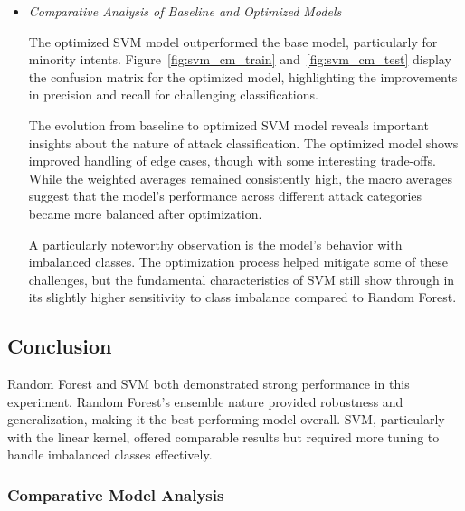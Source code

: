 \begin{itemize}
                \item \textit{Comparative Analysis of Baseline and Optimized Models}
                
                    \vspace{0.3em}
                    

                    The optimized SVM model outperformed the base model, particularly for minority intents. Figure~\ref{fig:svm_cm_train} and~\ref{fig:svm_cm_test} display the confusion matrix for the optimized model, highlighting the improvements in precision and recall for challenging classifications.
                    
                    The evolution from baseline to optimized SVM model reveals important insights about the nature of attack classification. The optimized model shows improved handling of edge cases, though with some interesting trade-offs. While the weighted averages remained consistently high, the macro averages suggest that the model's performance across different attack categories became more balanced after optimization.
            
                    A particularly noteworthy observation is the model's behavior with imbalanced classes. The optimization process helped mitigate some of these challenges, but the fundamental characteristics of SVM still show through in its slightly higher sensitivity to class imbalance compared to Random Forest.
                    

            \end{itemize}


    \subsection{Conclusion} %
    
        Random Forest and SVM both demonstrated strong performance in this experiment. Random Forest's ensemble nature provided robustness and generalization, making it the best-performing model overall. SVM, particularly with the linear kernel, offered comparable results but required more tuning to handle imbalanced classes effectively.
        
    
    \subsubsection{Comparative Model Analysis\\}
    
